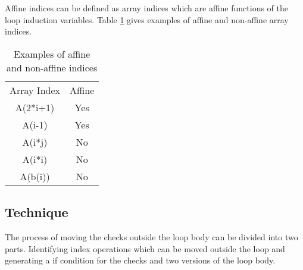 Affine indices can be defined as array indices which are affine functions of the loop induction variables. Table \ref{tab:affineIndex} gives examples of affine and non-affine array indices. 
\begin{table}[htbp]
\centering
\begin{tabular}{|c|c|}
\hline
Array Index & Affine \\ \hhline{|=|=|}
A(2*i+1)    & Yes    \\ \hline
A(i-1)    & Yes    \\ \hline
A(i*j)      & No    \\ \hline
A(i*i)      & No     \\ \hline
A(b(i))     & No     \\ \hline
\end{tabular}
\caption{Examples of affine and non-affine indices}
\label{tab:affineIndex}
\end{table}
\subsection{Technique}
The process of moving the checks outside the loop body can be divided into two parts. Identifying index operations which can be moved outside the loop and generating a if condition for the checks and two versions of the loop body.   
